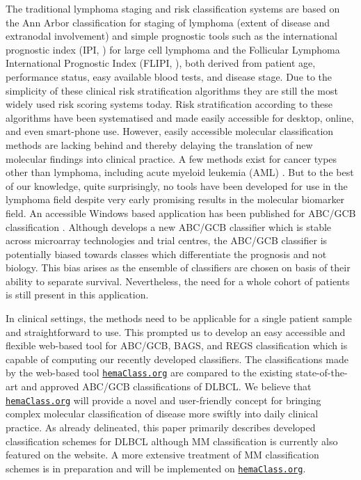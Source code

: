 \documentclass{bmcart}
\newcommand{\hemaClass}{\href{http://hemaClass.org}{\texttt{hemaClass.org}}}
\begin{document}
The traditional lymphoma staging and risk classification systems are based on the Ann Arbor classification for staging of lymphoma (extent of disease and extranodal involvement) and simple prognostic tools such as the international prognostic index (IPI, \citep{IPI}) for large cell lymphoma and the Follicular Lymphoma International Prognostic Index (FLIPI, \citep{FLIPI}), both derived from patient age, performance status, easy available blood tests, and disease stage.
Due to the simplicity of these clinical risk stratification algorithms they are still the most widely used risk scoring systems today.
Risk stratification according to these algorithms have been systematised and made easily accessible for desktop, online, and even smart-phone use.
However, easily accessible molecular classification methods are lacking behind and thereby delaying the translation of new molecular findings into clinical practice.
A few methods exist for cancer types other than lymphoma, including acute myeloid leukemia (AML) \citep{Huang2009}.
But to the best of our knowledge, quite surprisingly, no tools have been developed for use in the lymphoma field despite very early promising results in the molecular biomarker field.
An accessible Windows based application has been published for ABC/GCB classification \citep{Care2013}.
Although \citet{Care2013} develops a new ABC/GCB classifier which is stable across microarray technologies and trial centres, the ABC/GCB classifier is potentially biased towards classes which differentiate the prognosis and not biology.
This bias arises as the ensemble of classifiers are chosen on basis of their ability to separate survival.
Nevertheless, the need for a whole cohort of patients is still present in this application.

In clinical settings, the methods need to be applicable for a single patient sample and straightforward to use.
This prompted us to develop an easy accessible and flexible web-based tool for ABC/GCB, BAGS, and REGS classification which is capable of computing our recently developed classifiers.
The classifications made by the web-based tool \hemaClass{} are compared to the existing state-of-the-art and approved ABC/GCB classifications of DLBCL.
We believe that \hemaClass{} will provide a novel and user-friendly concept for bringing complex molecular classification of disease more swiftly into daily clinical practice.
As already delineated, this paper primarily describes developed classification schemes for DLBCL although MM classification is currently also featured on the website.
A more extensive treatment of MM classification schemes is in preparation and will be implemented on \hemaClass{}.
\end{document}
